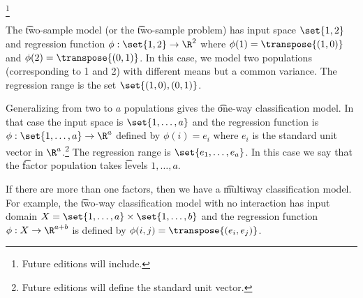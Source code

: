 
\footnote{Future editions will include.}


The \t{two-sample model} (or the \t{two-sample problem}) has input space $\set{1, 2}$ and regression function $\phi: \set{1, 2} \to \R^2$ where $\phi(1) = \transpose{(1, 0)}$ and $\phi(2) = \transpose{(0, 1)}$.
In this case, we model two populations (corresponding to 1 and 2) with different means but a common variance.
The regression range is the set $\set{(1, 0), (0, 1)}$.

Generalizing from two to $a$ populations gives the \t{one-way classification model}.
In that case the input space is $\set{1, \dots, a}$ and the regression function is $\phi: \set{1, \dots, a} \to \R^a$ defined by $\phi(i) = e_i$ where $e_i$ is the standard unit vector in $\R^a$.\footnote{Future editions will define the standard unit vector.}
The regression range is $\set{e_1, \dots, e_a}$.
In this case we say that the \t{factor} population takes \t{levels} $1, \dots, a$.

If there are more than one factors, then we have a \t{multiway classification model}.
For example, the \t{two-way classification model with no interaction} has input domain $X = \set{1, \dots, a} \times \set{1, \dots, b}$ and the regression function $\phi: X \to \R^{a + b}$ is defined by $\phi(i, j) = \transpose{(e_i, e_j)}$.

\blankpage
